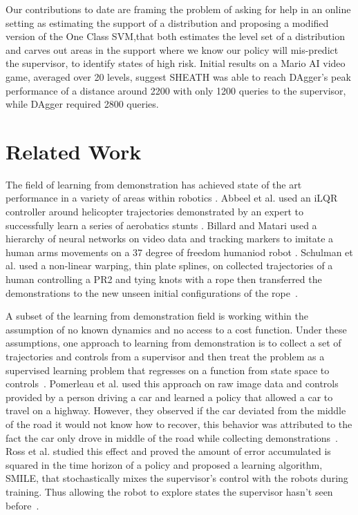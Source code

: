 \documentclass[10pt, conference]{ieeeconf}      %
\begin{document}
Our contributions to date are framing the problem of asking for help in an online setting as estimating the support of a distribution and proposing a modified version of the One Class SVM,that both estimates the level set of a distribution and carves out areas in the support where we know our policy will mis-predict the supervisor, to identify states of high risk.  Initial results on a Mario AI video game, averaged over 20 levels,  suggest SHEATH was able to reach DAgger's peak performance of a distance around 2200 with only 1200 queries to the supervisor, while DAgger required 2800 queries.  

\section{Related Work}
The field of learning from demonstration has achieved state of the art performance in a variety of areas within robotics \cite{argall2009survey}. Abbeel et al. used an iLQR controller around helicopter trajectories demonstrated by an expert to successfully learn a series of aerobatics stunts \cite{abbeel2007application}. Billard and Matari used a hierarchy of neural networks on video data and tracking markers to imitate a human arms movements on a 37 degree of freedom humaniod robot \cite{billard2001learning}. Schulman et al. used a non-linear warping, thin plate splines, on collected trajectories of a human controlling a PR2 and tying knots with a rope then transferred the demonstrations to the new unseen initial configurations of the rope~\cite{schulman2013case}. 

 A subset of the learning from demonstration field is working within the assumption of no known dynamics and no access to a cost function. Under these assumptions, one approach to learning from demonstration is to collect a set of trajectories and controls from a supervisor and then treat the problem as a supervised learning problem that regresses on a function from state space to controls~\cite{argall2009survey}. Pomerleau et al. used this approach on raw image data and controls provided by a person driving a car and learned a policy that allowed a car to travel on a highway. However, they observed if the car deviated from the middle of the road it would not know how to recover, this behavior was attributed to the fact the car only drove in middle of the road while collecting demonstrations~\cite{pomerleau1989alvinn}. Ross et al. studied this effect and proved the amount of error accumulated is squared in the time horizon of a policy and proposed a learning algorithm, SMILE, that stochastically mixes the supervisor's control with the robots during training. Thus allowing the robot to explore states the supervisor hasn't seen before~\cite{ross2010efficient}. 
\end{document}

